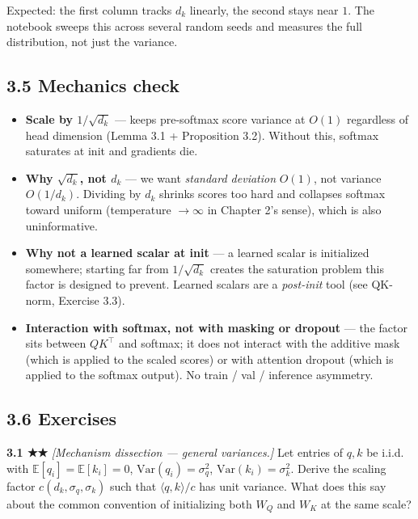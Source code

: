 \documentclass[
]{article}
\providecommand{\tightlist}{%
  \setlength{\itemsep}{0pt}\setlength{\parskip}{0pt}}
\begin{document}
Expected: the first column tracks \(d_k\) linearly, the second stays
near \(1\). The notebook sweeps this across several random seeds and
measures the full distribution, not just the variance.

\hypertarget{mechanics-check}{%
\subsection{3.5 Mechanics check}\label{mechanics-check}}

\begin{itemize}
\tightlist
\item
  \textbf{Scale by \(1/\sqrt{d_k}\)} --- keeps pre-softmax score
  variance at \(O(1)\) regardless of head dimension (Lemma 3.1 +
  Proposition 3.2). Without this, softmax saturates at init and
  gradients die.
\item
  \textbf{Why \(\sqrt{d_k}\), not \(d_k\)} --- we want \emph{standard
  deviation} \(O(1)\), not variance \(O(1/d_k)\). Dividing by \(d_k\)
  shrinks scores too hard and collapses softmax toward uniform
  (temperature \(\to \infty\) in Chapter 2's sense), which is also
  uninformative.
\item
  \textbf{Why not a learned scalar at init} --- a learned scalar is
  initialized somewhere; starting far from \(1/\sqrt{d_k}\) creates the
  saturation problem this factor is designed to prevent. Learned scalars
  are a \emph{post-init} tool (see QK-norm, Exercise 3.3).
\item
  \textbf{Interaction with softmax, not with masking or dropout} --- the
  factor sits between \(QK^\top\) and softmax; it does not interact with
  the additive mask (which is applied to the scaled scores) or with
  attention dropout (which is applied to the softmax output). No train /
  val / inference asymmetry.
\end{itemize}

\hypertarget{exercises}{%
\subsection{3.6 Exercises}\label{exercises}}

\textbf{3.1 ★★} \emph{{[}Mechanism dissection --- general variances.{]}}
Let entries of \(q, k\) be i.i.d. with
\(\mathbb{E}[q_i] = \mathbb{E}[k_i] = 0\),
\(\text{Var}(q_i) = \sigma_q^2\), \(\text{Var}(k_i) = \sigma_k^2\).
Derive the scaling factor \(c(d_k, \sigma_q, \sigma_k)\) such that
\(\langle q, k \rangle / c\) has unit variance. What does this say about
the common convention of initializing both \(W_Q\) and \(W_K\) at the
same scale?
\end{document}
